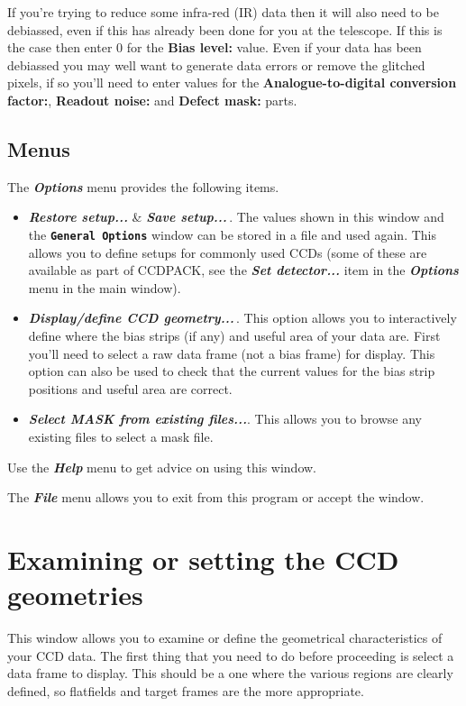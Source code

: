 \documentclass[11pt]{article}
\newcommand{\htmlref}[2]{#1}
\newcommand{\xref}[3]{#1}
\newcommand{\xlabel}[1]{}
\newcommand{\butt}[1]{{\bf \tt #1}}
\newcommand{\menu}[1]{{\bf \em #1}}
\newcommand{\wlab}[1]{{\bf #1}}
\begin{document}
If you're trying to \xref{reduce}{sun139}{IRreduction} some infra-red
(IR) data then it will also need to be debiassed, even if this has
already been done for you at the telescope. If this is the case then
enter 0 for the \wlab{Bias level:} value. Even if your data has been
debiassed you may well want to generate data errors or remove the
glitched pixels, if so you'll need to enter values for the
\wlab{Analogue-to-digital conversion factor:},
\wlab{Readout noise:} and \wlab{Defect mask:} parts.


\subsection{Menus \xlabel{CCDSetCCDGlobalsMenu}}

The \menu{Options} menu provides the following items.

\begin{itemize}
\item \menu{Restore setup...} \& \menu{Save setup...}\,. The values
shown in this window and the \butt{General Options} window can be
stored in a file and used again. This allows you to define setups for
commonly used CCDs (some of these are available as part of CCDPACK,
see the
\htmlref{\menu{Set detector...}}{CCDSetDetectorWindow}
item in the \menu{Options} menu in the main window).

\item \menu{Display/define CCD geometry...}\,. \label{definegeometry}
This option allows you to interactively define where the bias strips
(if any) and useful area of your data are. First you'll need to select
a raw data frame (not a bias frame) for display.  This option can also
be used to check that the current values for the bias strip positions
and useful area are correct.

\item \menu{Select MASK from existing files...}. This allows you to
browse any existing files to select a mask file.
\end{itemize}

Use the \menu{Help} menu to get advice on using this window.

The \menu{File} menu allows you to exit from this program or
accept the window.

\section{Examining or setting the CCD geometries \xlabel{CCDGeometryWindow}}
This window allows you to examine or define the geometrical
characteristics of your CCD data. The first thing that you need to do
before proceeding is select a data frame to display. This should be a
one where the various regions are clearly defined, so flatfields and
target frames are the more appropriate.
\end{document}
